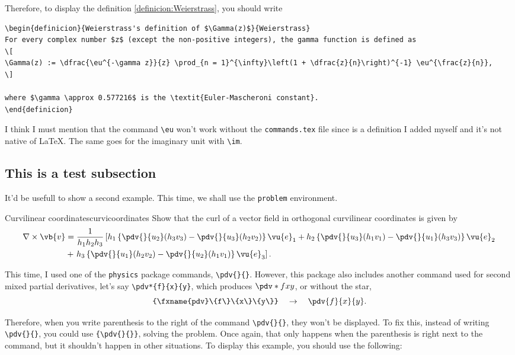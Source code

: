 Therefore, to display the definition \ref{definicion:Weierstrass}, you should write
\begin{verbatim}
\begin{definicion}{Weierstrass's definition of $\Gamma(z)$}{Weierstrass}
For every complex number $z$ (except the non-positive integers), the gamma function is defined as
\[
\Gamma(z) := \dfrac{\eu^{-\gamma z}}{z} \prod_{n = 1}^{\infty}\left(1 + \dfrac{z}{n}\right)^{-1} \eu^{\frac{z}{n}},
\]

where $\gamma \approx 0.577216$ is the \textit{Euler-Mascheroni constant}.
\end{definicion}
\end{verbatim}

I think I must mention that the command \verb|\eu| won't work without the \verb|commands.tex| file since is a definition I added myself and it's not native of \LaTeX. The same goes for the imaginary unit with \verb|\im|.

\subsection{This is a test subsection}
It'd be usefull to show a second example. This time, we shall use the \texttt{problem} environment.

\begin{problema}{Curvilinear coordinates}{curvicoordinates}
Show that the curl of a vector field in orthogonal curvilinear coordinates is given by
\begin{align*}
    \nabla \times \vb{v}
    &= \dfrac{1}{h_{1}h_{2}h_{3}}\left[h_{1} \left\lbrace {\pdv{}{u_{2}}} (h_{3}v_{3}) - {\pdv{}{u_{3}}} (h_{2}v_{2})\right\rbrace \vu{e}_{1} + h_{2}\left\lbrace {\pdv{}{u_{3}}} (h_{1}v_{1}) - {\pdv{}{u_{1}}} (h_{3}v_{3}) \right\rbrace \vu{e}_{2}\right.\\
    &+ \left. h_{3} \left\lbrace {\pdv{}{u_{1}}} (h_{2}v_{2}) - {\pdv{}{u_{2}}} (h_{1}v_{1}) \right\rbrace \vu{e}_{3}\right].
\end{align*}
\end{problema}

This time, I used one of the \texttt{physics} package commands, \verb|\pdv{}{}|. However, this package also includes another command used for second mixed partial derivatives, let's say \verb|\pdv*{f}{x}{y}|, which produces $\pdv*{f}{x}{y}$, or without the star,
\[
\verb|\pdv{f}{x}{y}| \quad \to \quad \pdv{f}{x}{y}.
\]

Therefore, when you write parenthesis to the right of the command \verb|\pdv{}{}|, they won't be displayed. To fix this, instead of writing \verb|\pdv{}{}|, you could use \verb|{\pdv{}{}}|, solving the problem. Once again, that only happens when the parenthesis is right next to the command, but it shouldn't happen in other situations. To display this example, you should use the following:

